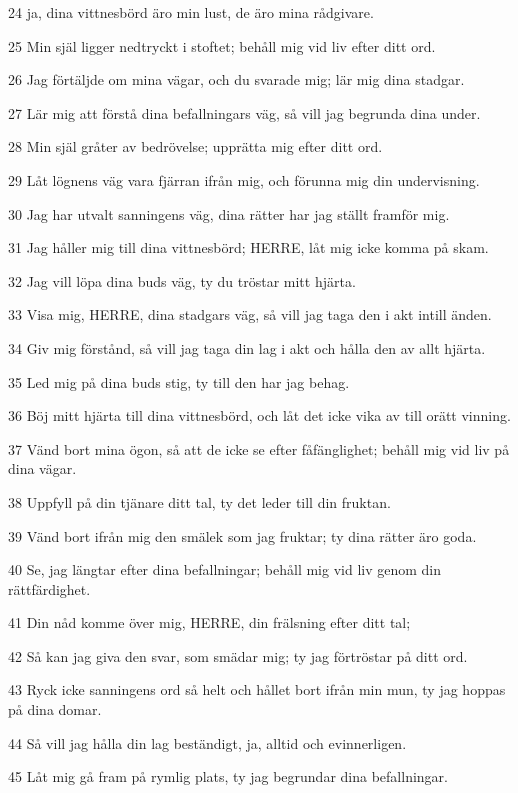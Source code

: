 \par 24 ja, dina vittnesbörd äro min lust, de äro mina rådgivare.
\par 25 Min själ ligger nedtryckt i stoftet; behåll mig vid liv efter ditt ord.
\par 26 Jag förtäljde om mina vägar, och du svarade mig; lär mig dina stadgar.
\par 27 Lär mig att förstå dina befallningars väg, så vill jag begrunda dina under.
\par 28 Min själ gråter av bedrövelse; upprätta mig efter ditt ord.
\par 29 Låt lögnens väg vara fjärran ifrån mig, och förunna mig din undervisning.
\par 30 Jag har utvalt sanningens väg, dina rätter har jag ställt framför mig.
\par 31 Jag håller mig till dina vittnesbörd; HERRE, låt mig icke komma på skam.
\par 32 Jag vill löpa dina buds väg, ty du tröstar mitt hjärta.
\par 33 Visa mig, HERRE, dina stadgars väg, så vill jag taga den i akt intill änden.
\par 34 Giv mig förstånd, så vill jag taga din lag i akt och hålla den av allt hjärta.
\par 35 Led mig på dina buds stig, ty till den har jag behag.
\par 36 Böj mitt hjärta till dina vittnesbörd, och låt det icke vika av till orätt vinning.
\par 37 Vänd bort mina ögon, så att de icke se efter fåfänglighet; behåll mig vid liv på dina vägar.
\par 38 Uppfyll på din tjänare ditt tal, ty det leder till din fruktan.
\par 39 Vänd bort ifrån mig den smälek som jag fruktar; ty dina rätter äro goda.
\par 40 Se, jag längtar efter dina befallningar; behåll mig vid liv genom din rättfärdighet.
\par 41 Din nåd komme över mig, HERRE, din frälsning efter ditt tal;
\par 42 Så kan jag giva den svar, som smädar mig; ty jag förtröstar på ditt ord.
\par 43 Ryck icke sanningens ord så helt och hållet bort ifrån min mun, ty jag hoppas på dina domar.
\par 44 Så vill jag hålla din lag beständigt, ja, alltid och evinnerligen.
\par 45 Låt mig gå fram på rymlig plats, ty jag begrundar dina befallningar.
